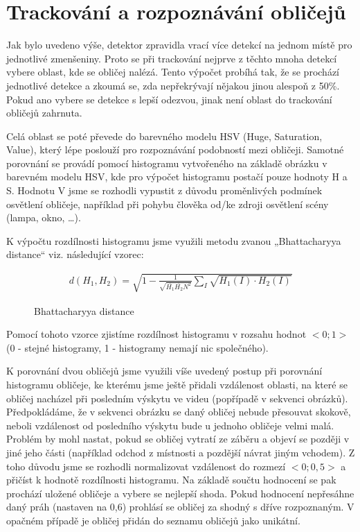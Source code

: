 \documentclass[12pt,a4paper,titlepage,final]{report}
\begin{document}
\section{Trackování a rozpoznávání obličejů}

Jak bylo uvedeno výše, detektor zpravidla vrací více detekcí na jednom místě pro jednotlivé zmenšeniny. Proto se při trackování nejprve z těchto mnoha detekcí vybere oblast, kde se obličej nalézá. Tento výpočet probíhá tak, že se prochází jednotlivé detekce a zkoumá se, zda nepřekrývají nějakou jinou alespoň z 50\%. Pokud ano vybere se detekce s lepší odezvou, jinak není oblast do trackování obličejů zahrnuta.

Celá oblast se poté převede do barevného modelu HSV (Huge, Saturation, Value), který lépe poslouží pro rozpoznávání podobností mezi obličeji. Samotné porovnání se provádí pomocí histogramu vytvořeného na základě obrázku v barevném modelu HSV, kde pro výpočet histogramu postačí pouze hodnoty H a S. Hodnotu V jsme se rozhodli vypustit z důvodu proměnlivých podmínek osvětlení obličeje, například při pohybu člověka od/ke zdroji osvětlení scény (lampa, okno, \dots). 

K výpočtu rozdílnosti histogramu jsme využili metodu zvanou „Bhattacharyya distance“ viz. následující vzorec:

\begin{figure}

\begin{align}
d(H_{1},H_{2})=\sqrt{1-\frac{1}{\sqrt{\overline{H_{1}}\overline{H_{2}}N^2}}\sum\limits_{I}\sqrt{H_{1}(I) \cdot H_{2}(I)}}
\end{align}

\caption{Bhattacharyya distance}
\end{figure}



				
Pomocí tohoto vzorce zjistíme rozdílnost histogramu v rozsahu hodnot $<0;1>$ (0 - stejné histogramy, 1 - histogramy nemají nic společného). 

K porovnání dvou obličejů jsme využili víše uvedený postup při porovnání histogramu obličeje, ke kterému jsme ještě přidali vzdálenost oblasti, na které se obličej nacházel při posledním výskytu ve videu (popřípadě v sekvenci obrázků). Předpokládáme, že v sekvenci obrázku se daný obličej nebude přesouvat skokově, neboli vzdálenost od posledního výskytu bude u jednoho obličeje velmi malá. Problém by mohl nastat, pokud se obličej vytratí ze záběru a objeví se později v jiné jeho části (například odchod z místnosti a pozdější návrat jiným vchodem). Z toho důvodu jsme se rozhodli normalizovat vzdálenost do rozmezí $<0;0,5>$ a přičíst k hodnotě rozdílnosti histogramu. Na základě součtu hodnocení se pak prochází uložené obličeje a vybere se nejlepší shoda. Pokud hodnocení nepřesáhne daný práh (nastaven na 0,6) prohlásí se obličej za shodný s dříve rozpoznaným. V opačném případě je obličej přidán do seznamu obličejů jako unikátní.
\end{document}
